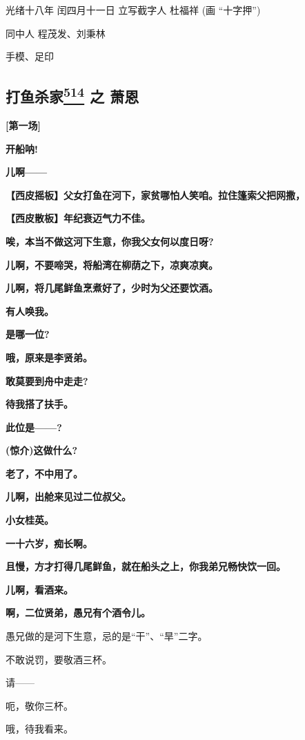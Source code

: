 光绪十八年 闰四月十一日 立写截字人 杜福祥 (画 ``十字押'')

同中人 程茂发、刘秉林

手模、足印

\hypertarget{ux6253ux9c7cux6740ux5bb6-ux4e4b-ux8427ux6069}{%
\subsection{\texorpdfstring{打鱼杀家\protect\hyperlink{fn514}{\textsuperscript{514}}
之
萧恩}{打鱼杀家514 之 萧恩}}\label{ux6253ux9c7cux6740ux5bb6-ux4e4b-ux8427ux6069}}

\textbf{{[}第一场{]}}

\textbf{开船呐!}

\textbf{儿啊------}

\textbf{【西皮摇板】父女打鱼在河下，家贫哪怕人笑咱。拉住篷索父把网撒，}

\textbf{【西皮散板】年纪衰迈气力不佳。}

\textbf{唉，本当不做这河下生意，你我父女何以度日呀?}

\textbf{儿啊，不要啼哭，将船湾在柳荫之下，凉爽凉爽。}

\textbf{儿啊，将几尾鲜鱼烹煮好了，少时为父还要饮酒。}

\textbf{有人唤我。}

\textbf{是哪一位?}

\textbf{哦，原来是李贤弟。}

\textbf{敢莫要到舟中走走?}

\textbf{待我搭了扶手。}

\textbf{此位是------?}

\textbf{(惊介)这做什么?}

\textbf{老了，不中用了。}

\textbf{儿啊，出舱来见过二位叔父。}

\textbf{小女桂英。}

\textbf{一十六岁，痴长啊。}

\textbf{且慢，方才打得几尾鲜鱼，就在船头之上，你我弟兄畅快饮一回。}

\textbf{儿啊，看酒来。}

\textbf{啊，二位贤弟，愚兄有个酒令儿。}

愚兄做的是河下生意，忌的是``干''、``旱''二字。

不敢说罚，要敬酒三杯。

请------

呃，敬你三杯。

哦，待我看来。

